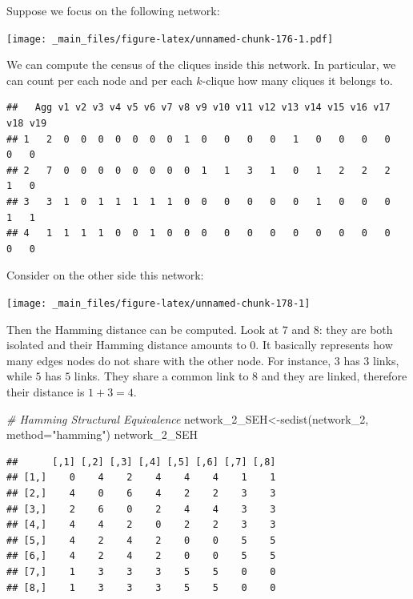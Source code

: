 \documentclass[
  notitlepage,
  onecolumn,
  openany]{book}
\newenvironment{Shaded}{\begin{snugshade}}{\end{snugshade}}
\newcommand{\AttributeTok}[1]{\textcolor[rgb]{0.77,0.63,0.00}{#1}}
\newcommand{\CommentTok}[1]{\textcolor[rgb]{0.56,0.35,0.01}{\textit{#1}}}
\newcommand{\FunctionTok}[1]{\textcolor[rgb]{0.00,0.00,0.00}{#1}}
\newcommand{\NormalTok}[1]{#1}
\newcommand{\OtherTok}[1]{\textcolor[rgb]{0.56,0.35,0.01}{#1}}
\newcommand{\SpecialCharTok}[1]{\textcolor[rgb]{0.00,0.00,0.00}{#1}}
\newcommand{\StringTok}[1]{\textcolor[rgb]{0.31,0.60,0.02}{#1}}
\begin{document}
Suppose we focus on the following network:

\texttt{[image: \_main\_files/figure-latex/unnamed-chunk-176-1.pdf]}

We can compute the census of the cliques inside this network. In particular, we can count per each node and per each \(k\)-clique how many cliques it belongs to.

\begin{Shaded}
\end{Shaded}

\begin{verbatim}
##   Agg v1 v2 v3 v4 v5 v6 v7 v8 v9 v10 v11 v12 v13 v14 v15 v16 v17 v18 v19
## 1   2  0  0  0  0  0  0  0  1  0   0   0   0   1   0   0   0   0   0   0
## 2   7  0  0  0  0  0  0  0  0  1   1   3   1   0   1   2   2   2   1   0
## 3   3  1  0  1  1  1  1  1  0  0   0   0   0   0   1   0   0   0   1   1
## 4   1  1  1  1  0  0  1  0  0  0   0   0   0   0   0   0   0   0   0   0
\end{verbatim}

Consider on the other side this network:

\texttt{[image: \_main\_files/figure-latex/unnamed-chunk-178-1]}

Then the Hamming distance can be computed. Look at \(7\) and \(8\): they are both isolated and their Hamming distance amounts to 0. It basically represents how many edges nodes do not share with the other node. For instance, \(3\) has 3 links, while \(5\) has \(5\) links. They share a common link to \(8\) and they are linked, therefore their distance is \(1+3 = 4\).

\begin{Shaded}
\begin{Highlighting}[]
\CommentTok{\# Hamming Structural Equivalence}
\NormalTok{network\_2\_SEH}\OtherTok{\textless{}{-}}\FunctionTok{sedist}\NormalTok{(network\_2, }\AttributeTok{method=}\StringTok{"hamming"}\NormalTok{)}
\NormalTok{network\_2\_SEH}
\end{Highlighting}
\end{Shaded}

\begin{verbatim}
##      [,1] [,2] [,3] [,4] [,5] [,6] [,7] [,8]
## [1,]    0    4    2    4    4    4    1    1
## [2,]    4    0    6    4    2    2    3    3
## [3,]    2    6    0    2    4    4    3    3
## [4,]    4    4    2    0    2    2    3    3
## [5,]    4    2    4    2    0    0    5    5
## [6,]    4    2    4    2    0    0    5    5
## [7,]    1    3    3    3    5    5    0    0
## [8,]    1    3    3    3    5    5    0    0
\end{verbatim}
\end{document}
